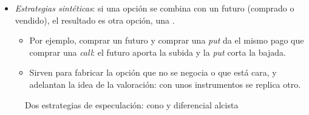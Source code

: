 \documentclass[11pt]{article}
\begin{document}
\begin{itemize}
\begin{itemize}
  \item En el  (\emph{bull spread}) se compra una \emph{call} de $K_1$ y se vende otra de $K_2>K_1$: la prima que se cobra abarata la estrategia y, a cambio, la ganancia se detiene en $K_2$ (panel derecho).
  \item El diferencial bajista (\emph{bear spread}) es el simétrico, y la mariposa (\emph{butterfly}) combina uno alcista y uno bajista para apostar a que el precio se quedará cerca de un valor.
  \end{itemize}
\item \emph{Estrategias sintéticas}: si una opción se combina con un futuro (comprado o vendido), el resultado es otra opción, una .
  \begin{itemize}
  \item Por ejemplo, comprar un futuro y comprar una \emph{put} da el mismo pago que comprar una \emph{call}: el futuro aporta la subida y la \emph{put} corta la bajada.
  \item Sirven para fabricar la opción que no se negocia o que está cara, y adelantan la idea de la valoración: con unos instrumentos se replica otro.
  \end{itemize}
\end{itemize}

\begin{figure}[H]
\centering
\caption{Dos estrategias de especulación: cono y diferencial alcista}\label{fig:estrategias-opciones}
\end{figure}
\end{document}
